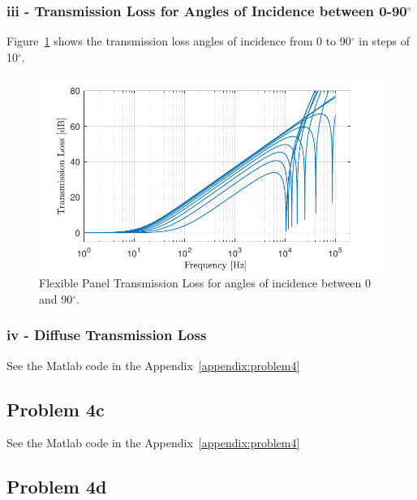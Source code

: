 {\vspace{0.25cm}
\subsubsection*{iii - Transmission Loss for Angles of Incidence between 0-90$^\circ$}

Figure~\ref{figure:q4iiitransmissionLossAt75} shows the transmission loss angles of incidence from 0 to 90$^\circ$ in steps of 10$^\circ$.

\begin{figure}[htbp]
    \center
    \includegraphics[scale=0.9]{Q4iii TL for 75 AOI.pdf}
    \vspace{0.25cm}
    \caption{Flexible Panel Transmission Loss for angles of incidence between 0 and 90$^\circ$.}
    \label{figure:q4iiitransmissionLossAt75}
\end{figure}



\vspace{0.25cm}
\subsubsection*{iv - Diffuse Transmission Loss}

See the Matlab code in the Appendix~\ref{appendix:problem4}



\newpage
\subsection*{Problem 4c}

See the Matlab code in the Appendix~\ref{appendix:problem4}



\subsection*{Problem 4d}

}
